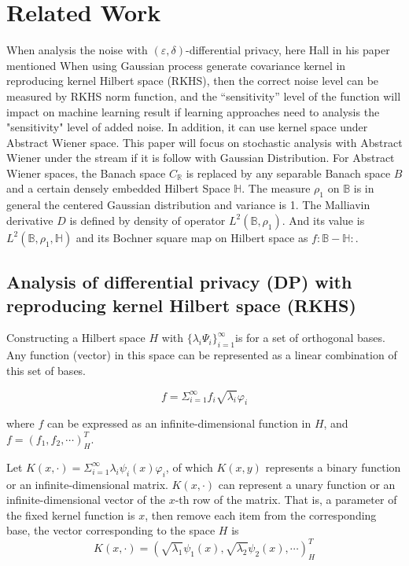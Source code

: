 \documentclass[journal,transmag]{IEEEtran}
\begin{document}
\section{Related Work}
When analysis the noise with $(\varepsilon,\delta)$-differential privacy, here Hall in his paper\cite{hall2013differential} mentioned When using Gaussian process generate covariance kernel in  reproducing kernel Hilbert space (RKHS), then the correct noise level can be measured by RKHS norm function, and the “sensitivity” level of the function will impact on machine learning result if learning approaches need to analysis the "sensitivity" level of added noise. In addition, it can use kernel space under Abstract Wiener space\cite{osswald2003malliavin}. This paper will focus on stochastic analysis with Abstract Wiener under the stream if it is follow with Gaussian Distribution. For Abstract Wiener spaces, the Banach space $C_{\mathbb{R}}$ is replaced by any separable Banach space $B$ and a certain densely embedded Hilbert Space $\mathbb{H}$. The measure $\rho_1$ on $\mathbb{B}$ is in general the centered Gaussian distribution and variance is 1. The Malliavin derivative $D$ is defined by density of operator $L^2(\mathbb{B},\rho_1)$. And its value is $L^2(\mathbb{B},\rho_1,\mathbb{H})$  and its Bochner square map 
on Hilbert space as $f : \mathbb{B}-\mathbb{H}:$.

\subsection{Analysis of differential privacy (DP) with reproducing kernel Hilbert space (RKHS)}
\nobreak
Constructing a Hilbert space $H$ with $\{\lambda_i \Psi_i\}_{i=1}^\infty $is for a set of orthogonal bases. Any function (vector) in this space can be represented as a linear combination of this set of bases. 

\begin{equation}
    f=\Sigma_{i=1}^\infty f_i \sqrt{\lambda_i} \varphi_i
\end{equation}

\noindent where $f$ can be expressed as an infinite-dimensional function in $H$, and $f=(f_1,f_2,\cdots)_H^T$.

Let $K(x,\cdot)=\Sigma_{i=1}^\infty \lambda_i \psi_i (x) \varphi_i $, of which $K(x,y)$ represents a binary function or an infinite-dimensional matrix. $K(x,\cdot)$ can represent a unary function or an infinite-dimensional vector of the $x$-th row of the matrix. That is, a parameter of the fixed kernel function is $x$, then remove each item from the corresponding base, the vector corresponding to the space $H$ is
\begin{equation}
    K(x,\cdot)=(\sqrt{\lambda_1} \psi_1 (x), \sqrt{\lambda_2} \psi_2 (x),\cdots)_H^T
\label{eq:hsp1}
\end{equation} 
\end{document}
